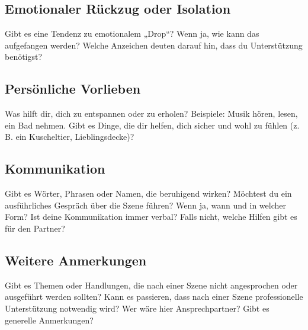\documentclass[a4paper,12pt]{article}
\begin{document}
\subsection{Emotionaler Rückzug oder Isolation}
\noindent Gibt es eine Tendenz zu emotionalem „Drop“? Wenn ja, wie kann das aufgefangen werden? Welche Anzeichen deuten darauf hin, dass du Unterstützung benötigst? \newline
\noindent \TextField[name=AftercareDrop,multiline=true,height=7em, width=37em]{}

\subsection{Persönliche Vorlieben}
\noindent Was hilft dir, dich zu entspannen oder zu erholen? Beispiele: Musik hören, lesen, ein Bad nehmen. Gibt es Dinge, die dir helfen, dich sicher und wohl zu fühlen (z. B. ein Kuscheltier, Lieblingsdecke)? \newline
\noindent \TextField[name=AftercarePreference,multiline=true,height=7em, width=37em]{}

\subsection{Kommunikation}
\noindent Gibt es Wörter, Phrasen oder Namen, die beruhigend wirken? Möchtest du ein ausführliches Gespräch über die Szene führen? Wenn ja, wann und in welcher Form? Ist deine Kommunikation immer verbal? Falls nicht, welche Hilfen gibt es für den Partner?\newline
\noindent \TextField[name=AftercareKommunikation,multiline=true,height=7em, width=37em]{}

\subsection{Weitere Anmerkungen}
\noindent Gibt es Themen oder Handlungen, die nach einer Szene nicht angesprochen oder ausgeführt werden sollten? Kann es passieren, dass nach einer Szene professionelle Unterstützung notwendig wird? Wer wäre hier Ansprechpartner? Gibt es generelle Anmerkungen?\newline
\noindent \TextField[name=AftercareBesonders,multiline=true,height=17em, width=37em]{}
\end{document}
